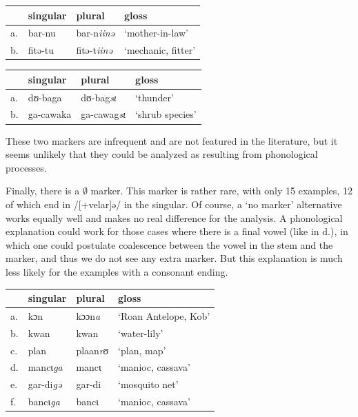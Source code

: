 \begin{exe}
    \ex \label{inne-kasem}
    \begin{tabular}[t]{llll}
      & singular & plural    & gloss              \\
      \midrule
      a. & bar-nu   & bar-n\textit{iinə}  & `mother-in-law'    \\
      b. & fitə-tu  & fitə-t\textit{iinə} & `mechanic, fitter' \\
    \end{tabular}
\end{exe}

\begin{exe}
    \ex \label{si-kasem}
    \begin{tabular}[t]{llll}
      & singular  & plural     & gloss           \\
      \midrule
      a. & dʊ-baga   & dʊ-bag\textit{sɩ}   & `thunder'       \\
      b. & ga-cawaka & ga-cawag\textit{sɩ} & `shrub species' \\
    \end{tabular}
\end{exe}

These two markers are infrequent and are not featured in the literature, but it seems unlikely that they could be analyzed as resulting from phonological processes.

Finally, there is a $\emptyset$ marker. This marker is rather rare, with only 15 examples, 12 of which end in /[+velar]ə/ in the singular. Of course, a `no marker' alternative works equally well and makes no real difference for the analysis. A phonological explanation could work for those cases where there is a final vowel (like in d.), in which one could postulate coalescence between the vowel in the stem and the marker, and thus we do not see any extra marker. But this explanation is much less likely for the examples with a consonant ending.

\begin{exe}
    \ex \label{0-kasem}
    \begin{tabular}[t]{llll}
      & singular          & plural           & gloss                \\
      \midrule
      a. & kɔn               & kɔɔn\textit{a}   & `Roan Antelope, Kob' \\
      b. & kwan              & kwan             & `water-lily'         \\
      c. & plan              & plaan\textit{rʊ} & `plan, map'          \\
      d. & mancɩ\textit{ga}  & mancɩ            & `manioc, cassava'    \\
      e. & gar-di\textit{gə} & gar-di           & `mosquito net'       \\
      f. & bancɩ\textit{ga}  & bancɩ            & `manioc, cassava'    \\
    \end{tabular}
\end{exe}

